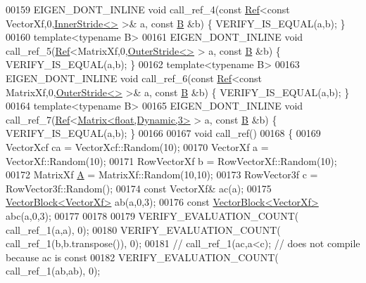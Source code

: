 \begin{DoxyCode}
00159 EIGEN\_DONT\_INLINE \textcolor{keywordtype}{void} call\_ref\_4(\textcolor{keyword}{const} \hyperlink{group___core___module_class_eigen_1_1_ref}{Ref}<\textcolor{keyword}{const} VectorXf,0,\hyperlink{class_eigen_1_1_inner_stride}{InnerStride<>} >& a, \textcolor{keyword}{const} 
      \hyperlink{group___core___module_class_eigen_1_1_matrix}{B} &b) \{ VERIFY\_IS\_EQUAL(a,b); \}
00160 \textcolor{keyword}{template}<\textcolor{keyword}{typename} B>
00161 EIGEN\_DONT\_INLINE \textcolor{keywordtype}{void} call\_ref\_5(\hyperlink{group___core___module_class_eigen_1_1_ref}{Ref}<MatrixXf,0,\hyperlink{class_eigen_1_1_outer_stride}{OuterStride<>} > a, \textcolor{keyword}{const} 
      \hyperlink{group___core___module_class_eigen_1_1_matrix}{B} &b) \{ VERIFY\_IS\_EQUAL(a,b); \}
00162 \textcolor{keyword}{template}<\textcolor{keyword}{typename} B>
00163 EIGEN\_DONT\_INLINE \textcolor{keywordtype}{void} call\_ref\_6(\textcolor{keyword}{const} \hyperlink{group___core___module_class_eigen_1_1_ref}{Ref}<\textcolor{keyword}{const} MatrixXf,0,\hyperlink{class_eigen_1_1_outer_stride}{OuterStride<>} >& a, \textcolor{keyword}{const} 
      \hyperlink{group___core___module_class_eigen_1_1_matrix}{B} &b) \{ VERIFY\_IS\_EQUAL(a,b); \}
00164 \textcolor{keyword}{template}<\textcolor{keyword}{typename} B>
00165 EIGEN\_DONT\_INLINE \textcolor{keywordtype}{void} call\_ref\_7(\hyperlink{group___core___module_class_eigen_1_1_ref}{Ref}<\hyperlink{group___core___module_class_eigen_1_1_matrix}{Matrix<float,Dynamic,3>} > a, \textcolor{keyword}{const} 
      \hyperlink{group___core___module_class_eigen_1_1_matrix}{B} &b) \{ VERIFY\_IS\_EQUAL(a,b); \}
00166 
00167 \textcolor{keywordtype}{void} call\_ref()
00168 \{
00169   VectorXcf ca  = VectorXcf::Random(10);
00170   VectorXf a    = VectorXf::Random(10);
00171   RowVectorXf b = RowVectorXf::Random(10);
00172   MatrixXf \hyperlink{group___core___module_class_eigen_1_1_matrix}{A}    = MatrixXf::Random(10,10);
00173   RowVector3f c = RowVector3f::Random();
00174   \textcolor{keyword}{const} VectorXf& ac(a);
00175   \hyperlink{group___core___module_class_eigen_1_1_vector_block}{VectorBlock<VectorXf>} ab(a,0,3);
00176   \textcolor{keyword}{const} \hyperlink{group___core___module_class_eigen_1_1_vector_block}{VectorBlock<VectorXf>} abc(a,0,3);
00177   
00178 
00179   VERIFY\_EVALUATION\_COUNT( call\_ref\_1(a,a), 0);
00180   VERIFY\_EVALUATION\_COUNT( call\_ref\_1(b,b.transpose()), 0);
00181 \textcolor{comment}{//   call\_ref\_1(ac,a<c);           // does not compile because ac is const}
00182   VERIFY\_EVALUATION\_COUNT( call\_ref\_1(ab,ab), 0);

\end{DoxyCode}
